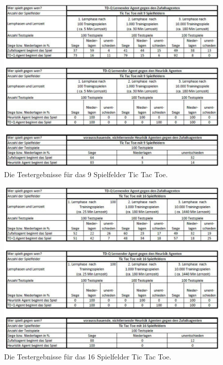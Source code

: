 \begin{figure}[!htbp]
  \centering
  \includegraphics[angle = 90, scale = 1]{inhalt/abbildungen/testergebnisse_9Spielfelder.pdf}
  \caption{Die Testergebnisse für das 9 Spielfelder Tic Tac Toe.}
  \label{fig:Testergebnisse für das 9 Spielfelder Tic Tac Toe}
\end{figure} 

\begin{figure}[!htbp]
  \centering
  \includegraphics[angle = 90, scale = 1]{inhalt/abbildungen/testergebnisse_16Spielfelder.pdf}
  \caption{Die Testergebnisse für das 16 Spielfelder Tic Tac Toe.}
  \label{fig:Testergebnisse für das 16 Spielfelder Tic Tac Toe}
\end{figure} 